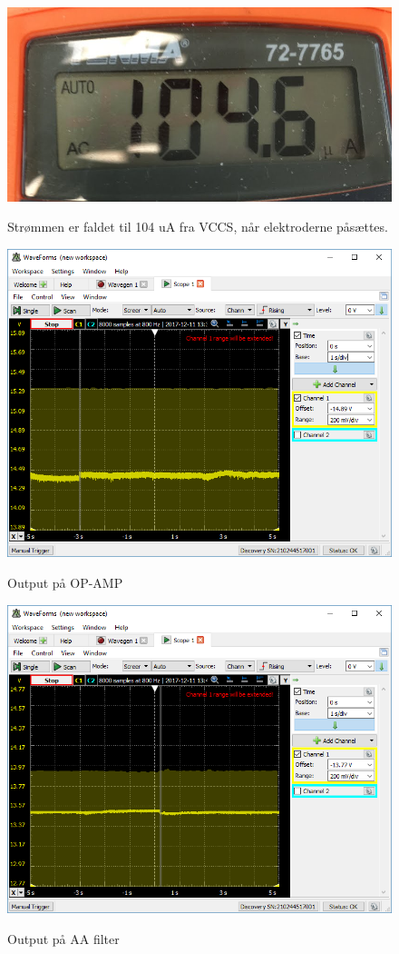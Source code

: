 \begin{figure}[H] 
\centering
{\includegraphics[width=12cm]
{Figure/integrationstestINA2udstrom}}
\caption{Strømmen er faldet til 104 uA fra VCCS, når elektroderne påsættes.}
\label{fig:integrationstestINA2udstrom}
\end{figure}

\begin{figure}[H] 
\centering
{\includegraphics[width=12cm]
{Figure/integrationstestOPAMPud}}
\caption{Output på OP-AMP}
\label{fig:integrationstestOPAMPud}
\end{figure}


\begin{figure}[H] 
\centering
{\includegraphics[width=12cm]
{Figure/integrationstestAAud}}
\caption{Output på AA filter}
\label{fig:integrationstestAAud}
\end{figure}

